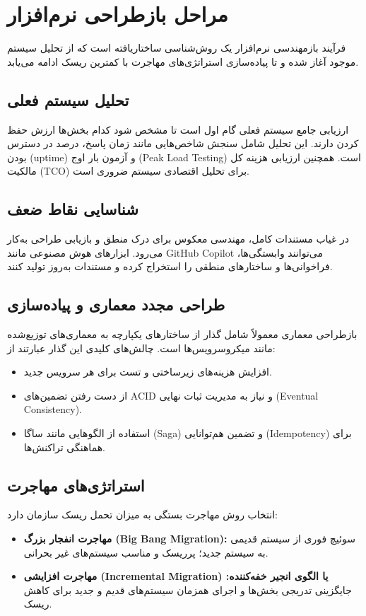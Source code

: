 \section{مراحل بازطراحی نرم‌افزار}
\label{sec:ch4-process}

فرآیند بازمهندسی نرم‌افزار یک روش‌شناسی ساختاریافته است که از تحلیل سیستم موجود آغاز شده و تا پیاده‌سازی استراتژی‌های مهاجرت با کمترین ریسک ادامه می‌یابد.

\subsection{تحلیل سیستم فعلی}
ارزیابی جامع سیستم فعلی گام اول است تا مشخص شود کدام بخش‌ها ارزش حفظ کردن دارند. این تحلیل شامل سنجش شاخص‌هایی مانند زمان پاسخ، درصد در دسترس بودن (uptime) و آزمون بار اوج (Peak Load Testing) است. همچنین ارزیابی هزینه کل مالکیت (TCO) برای تحلیل اقتصادی سیستم ضروری است.

\subsection{شناسایی نقاط ضعف}
در غیاب مستندات کامل، مهندسی معکوس برای درک منطق و بازیابی طراحی به‌کار می‌رود. ابزارهای هوش مصنوعی مانند GitHub Copilot می‌توانند وابستگی‌ها، فراخوانی‌ها و ساختارهای منطقی را استخراج کرده و مستندات به‌روز تولید کنند.

\subsection{طراحی مجدد معماری و پیاده‌سازی}
بازطراحی معماری معمولاً شامل گذار از ساختارهای یکپارچه به معماری‌های توزیع‌شده مانند میکروسرویس‌ها است.  
چالش‌های کلیدی این گذار عبارتند از:
\begin{itemize}
    \item افزایش هزینه‌های زیرساختی و تست برای هر سرویس جدید.
    \item از دست رفتن تضمین‌های ACID و نیاز به مدیریت ثبات نهایی (Eventual Consistency).
    \item استفاده از الگوهایی مانند ساگا (Saga) و تضمین هم‌توانایی (Idempotency) برای هماهنگی تراکنش‌ها.
\end{itemize}

\subsection{استراتژی‌های مهاجرت}
انتخاب روش مهاجرت بستگی به میزان تحمل ریسک سازمان دارد:
\begin{itemize}
    \item \textbf{مهاجرت انفجار بزرگ (Big Bang Migration):} سوئیچ فوری از سیستم قدیمی به سیستم جدید؛ پرریسک و مناسب سیستم‌های غیر بحرانی.
    \item \textbf{مهاجرت افزایشی (Incremental Migration) یا الگوی انجیر خفه‌کننده:} جایگزینی تدریجی بخش‌ها و اجرای همزمان سیستم‌های قدیم و جدید برای کاهش ریسک.
\end{itemize}
